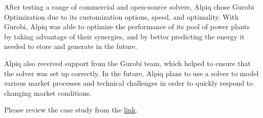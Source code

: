 \documentclass[
  letterpaper,
  DIV=11,
  numbers=noendperiod]{scrreprt}
\begin{document}
After testing a range of commercial and open-source solvers, Alpiq chose
Gurobi Optimization due to its customization options, speed, and
optimality. With Gurobi, Alpiq was able to optimize the performance of
its pool of power plants by taking advantage of their synergies, and by
better predicting the energy it needed to store and generate in the
future.

Alpiq also received support from the Gurobi team, which helped to ensure
that the solver was set up correctly. In the future, Alpiq plans to use
a solver to model various market processes and technical challenges in
order to quickly respond to changing market conditions.

Please review the case study from the
\href{https://www.gurobi.com/wp-content/uploads/2022/08/CaseStudy-2021Dec-Alpiq_Eng.pdf?x58432}{link}.
\end{document}
